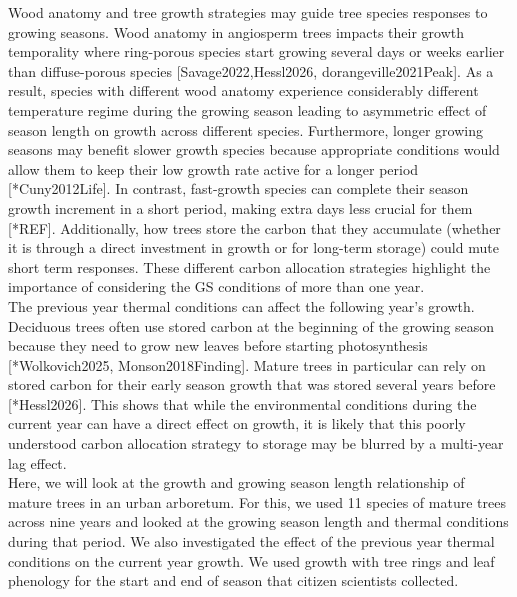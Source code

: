 \documentclass{article}\usepackage[]{graphicx}\usepackage[]{xcolor}
\begin{document}
Wood anatomy and tree growth strategies may guide tree species responses to growing seasons. Wood anatomy in angiosperm trees impacts their growth temporality where ring-porous species start growing several days or weeks earlier than diffuse-porous species [Savage2022,Hessl2026, dorangeville2021Peak]. As a result, species with different wood anatomy experience considerably different temperature regime during the growing season leading to asymmetric effect of season length on growth across different species. Furthermore, longer growing seasons may benefit slower growth species because appropriate conditions would allow them to keep their low growth rate active for a longer period [*Cuny2012Life]. In contrast, fast-growth species can complete their season growth increment in a short period, making extra days less crucial for them  [*REF]. Additionally, how trees store the carbon that they accumulate (whether it is through a direct investment in growth or for long-term storage) could mute short term responses. These different carbon allocation strategies highlight the importance of considering the GS conditions of more than one year. \\

The previous year thermal conditions can affect the following year's growth. Deciduous trees often use stored carbon at the beginning of the growing season because they need to grow new leaves before starting photosynthesis [*Wolkovich2025, Monson2018Finding]. Mature trees in particular can rely on stored carbon for their early season growth that was stored several years before [*Hessl2026]. This shows that while the environmental conditions during the current year can have a direct effect on growth, it is likely that this poorly understood carbon allocation strategy to storage may be blurred by a multi-year lag effect. \\

Here, we will look at the growth and growing season length relationship of mature trees in an urban arboretum. For this, we used 11 species of mature trees across nine years and looked at the growing season length and thermal conditions during that period. We also investigated the effect of the previous year thermal conditions on the current year growth. We used growth with tree rings and leaf phenology for the start and end of season that citizen scientists collected.

\clearpage
\end{document}
